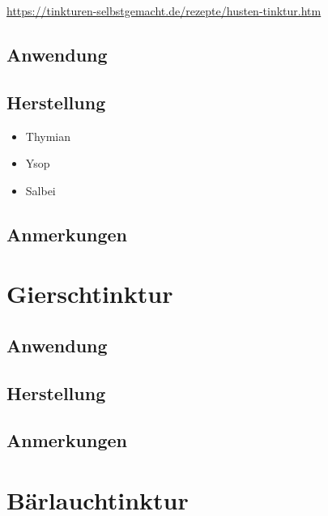 \cite{tinkturen}  

\url{https://tinkturen-selbstgemacht.de/rezepte/husten-tinktur.htm} 


 

\subsection{Anwendung}

\subsection{Herstellung}

\begin{itemize}
	\item Thymian
	\item Ysop
	\item Salbei
\end{itemize}

\subsection{Anmerkungen}



\newpage



\section{Gierschtinktur}

    

\subsection{Anwendung}

\subsection{Herstellung}

\subsection{Anmerkungen}



\newpage



\section{Bärlauchtinktur}

